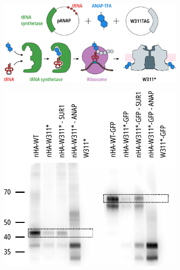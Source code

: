 \begin{figure}[h]
	\centering
	\begin{subfigure}[t]{0.9\textwidth}
		\caption{}\label{ch3fig:amber_codon}
		\centering
		\includegraphics[width=\textwidth]{amber_codon.pdf}
	\end{subfigure}
	\vfill
	\begin{subfigure}[t]{0.45\textwidth}
		\caption{}\label{ch3fig:western_1}
		\centering
		\includegraphics[width=\textwidth]{western_1.pdf}
	\end{subfigure}
	\hfill
	\begin{subfigure}[t]{0.45\textwidth}
		\caption{}\label{ch3fig:western_2}
		\centering

\end{subfigure}
\end{figure}
